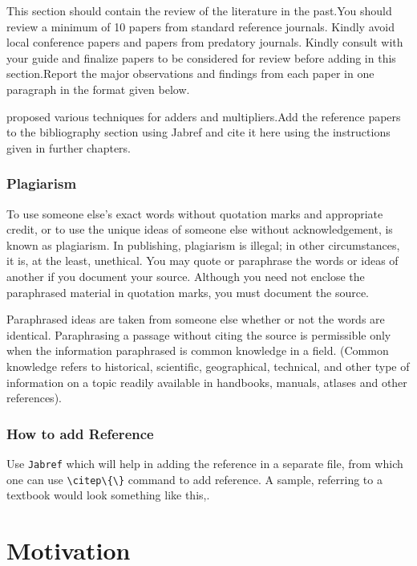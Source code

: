 This section should contain the review of the literature in the past.You should review a minimum of 10 papers from standard reference journals. Kindly avoid local conference papers and papers from predatory journals. Kindly consult with your guide and finalize papers to be considered for review before adding in this section.Report the major observations and findings from each paper in one paragraph in the format given below.

proposed various techniques for adders and multipliers.Add the reference papers to the bibliography section using Jabref and cite it here using the instructions given in further chapters.


\subsubsection{\textbf{Plagiarism}}

To use someone else's exact words without quotation marks and appropriate credit, or to use the unique ideas of someone else without acknowledgement, is known as plagiarism. In publishing, plagiarism is illegal; in other circumstances, it is, at the least, unethical. You may quote or paraphrase the words or ideas of another if you document your source. Although you need not enclose the paraphrased material in quotation marks, you must document the source. 

Paraphrased ideas are taken from someone else whether or not the words are identical. Paraphrasing a passage without citing the source is permissible only when the information paraphrased is common knowledge in a field. (Common knowledge refers to historical, scientific, geographical, technical, and other type of information on a topic readily available in handbooks, manuals, atlases and other references). 

\subsubsection{How to add Reference}
Use \texttt{Jabref} which will help in adding the reference in a separate file, from which one can use \verb|\citep\{\}| command to add reference. A sample, referring to a textbook would look something like this,\cite{Razavi2000}.

\section[Motivation]{\textbf{Motivation}}

